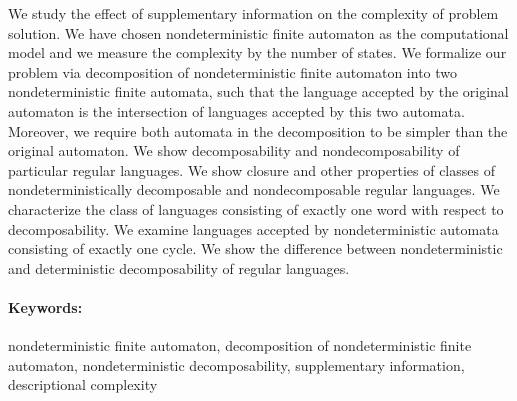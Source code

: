 \documentclass[12pt, oneside]{book}
\begin{document}
We study the effect of supplementary information on the complexity of problem solution. We have chosen nondeterministic finite automaton as the computational model and we measure the complexity by the number of states. We formalize our problem via decomposition of nondeterministic finite automaton into two nondeterministic finite automata, such that the language accepted by the original automaton is the intersection of languages accepted by this two automata. Moreover, we require both automata in the decomposition to be simpler than the original automaton. We show decomposability and nondecomposability of particular regular languages. We show closure and other properties of classes of nondeterministically decomposable and nondecomposable regular languages. We characterize the class of languages consisting of exactly one word with respect to decomposability. We examine languages accepted by nondeterministic automata consisting of exactly one cycle. We show the difference between nondeterministic and deterministic decomposability of regular languages.


\paragraph*{Keywords:} nondeterministic finite automaton, decomposition of nondeterministic finite automaton, nondeterministic decomposability, supplementary information, descriptional complexity


%
%



\newpage 

\tableofcontents



\newpage 
\end{document}
